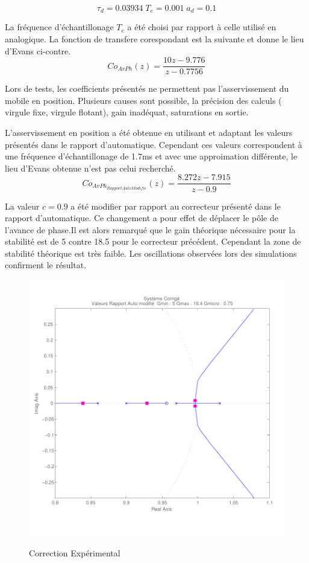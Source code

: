 \documentclass[11pt, french]{article} %
\begin{document}
\[\tau_d=0.03934 \; T_e=0.001 \; a_d=0.1\]

La fréquence d'échantillonage $T_e$ a été choisi par rapport à celle utilisé en analogique. La fonction de transfere corespondant est la suivante et donne le lieu d'Evans ci-contre.
\[Co_{AvPh}(z)=\dfrac{10 z - 9.776}{z -0.7756}\]

Lors de tests, les coefficients présentés ne permettent pas l'asservissement du mobile en position. Plusieurs causes sont possible, la précision des calculs ( virgule fixe, virgule flotant), gain inadéquat, saturations en sortie.

L'asservissement en position a été obtenue en utilisant et adaptant les valeurs présentés dans le rapport d'automatique. Cependant ces valeurs correspondent à une fréquence d'échantillonage de 1.7ms et avec une approimation différente, le lieu d'Evans obtenue n'est pas celui recherché.
\[  Co_{AvPh_{Rapport Auto Modifie}}(z) = \dfrac {8.272z - 7.915} {z - 0.9} \]

La valeur $c=0.9$ a été modifier par rapport au correcteur présenté dans le rapport d'automatique. Ce changement a pour effet de déplacer le pôle de l'avance de phase.Il est alors remarqué que le gain théorique nécessaire pour la stabilité est de 5 contre 18.5 pour le correcteur précédent. Cependant la zone de stabilité théorique est très faible. Les oscillations observées lors des simulations confirment le résultat.

\begin{figure}[h!]
	\centering
	\includegraphics[width = 15cm,trim=0 1.4cm 0 0.7cm ,clip=true]
					{SolutionNumerique/SystemeCorrigeSolex.pdf}
	\label{CorrExpe}	
	\caption{Correction Expérimental}
\end{figure}
\end{document}
